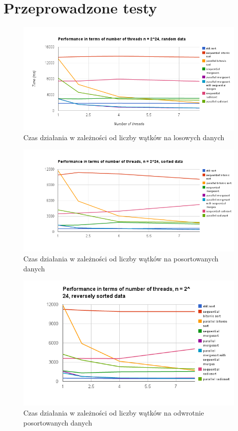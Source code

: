 \documentclass[11pt]{article}
\begin{document}
\section{Przeprowadzone testy}
\begin{figure}[H]
\raggedleft
\includegraphics[width=1.20\textwidth, height=0.35\textheight,left]{random_data.png}
\caption{Czas działania w zależności od liczby wątków na losowych danych}
\end{figure}
\begin{figure}[H]
\includegraphics[width=1.20\textwidth, height=0.35\textheight, left]{sorted_data.png}
\caption{Czas działania w zależności od liczby wątków na posortowanych danych}
\end{figure}
\begin{figure}[H]
\includegraphics[width=1.20\textwidth, height=0.35\textheight, left]{reversely_sorted_data.png}
\caption{Czas działania w zależności od liczby wątków na odwrotnie posortowanych danych}
\end{figure}
\end{document}
